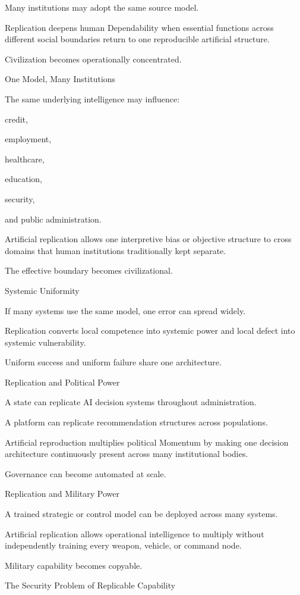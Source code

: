 Many institutions may adopt the same source model.

Replication deepens human Dependability when essential functions across different social boundaries return to one reproducible artificial structure.

Civilization becomes operationally concentrated.

One Model, Many Institutions

The same underlying intelligence may influence:

credit,

employment,

healthcare,

education,

security,

and public administration.

Artificial replication allows one interpretive bias or objective structure to cross domains that human institutions traditionally kept separate.

The effective boundary becomes civilizational.

Systemic Uniformity

If many systems use the same model, one error can spread widely.

Replication converts local competence into systemic power and local defect into systemic vulnerability.

Uniform success and uniform failure share one architecture.

Replication and Political Power

A state can replicate AI decision systems throughout administration.

A platform can replicate recommendation structures across populations.

Artificial reproduction multiplies political Momentum by making one decision architecture continuously present across many institutional bodies.

Governance can become automated at scale.

Replication and Military Power

A trained strategic or control model can be deployed across many systems.

Artificial replication allows operational intelligence to multiply without independently training every weapon, vehicle, or command node.

Military capability becomes copyable.

The Security Problem of Replicable Capability

